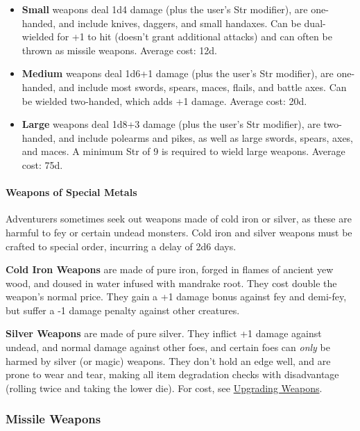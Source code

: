 \documentclass{book}
\providecommand{\tightlist}{%
\setlength{\itemsep}{0pt}\setlength{\parskip}{0pt}}
\begin{document}
\begin{itemize}
\tightlist
\item
  \textbf{Small} weapons deal 1d4 damage (plus the user's Str modifier),
  are one-handed, and include knives, daggers, and small handaxes. Can
  be dual-wielded for +1 to hit (doesn't grant additional attacks) and
  can often be thrown as missile weapons. Average cost: 12d.
\item
  \textbf{Medium} weapons deal 1d6+1 damage (plus the user's Str
  modifier), are one-handed, and include most swords, spears, maces,
  flails, and battle axes. Can be wielded two-handed, which adds +1
  damage. Average cost: 20d.
\item
  \textbf{Large} weapons deal 1d8+3 damage (plus the user's Str
  modifier), are two-handed, and include polearms and pikes, as well as
  large swords, spears, axes, and maces. A minimum Str of 9 is required
  to wield large weapons. Average cost: 75d.
\end{itemize}

\paragraph{Weapons of Special Metals}\label{weapons-of-special-metals}

Adventurers sometimes seek out weapons made of cold iron or silver, as
these are harmful to fey or certain undead monsters. Cold iron and
silver weapons must be crafted to special order, incurring a delay of
2d6 days.

\textbf{Cold Iron Weapons} are made of pure iron, forged in flames of
ancient yew wood, and doused in water infused with mandrake root. They
cost double the weapon's normal price. They gain a +1 damage bonus
against fey and demi-fey, but suffer a -1 damage penalty against other
creatures.

\textbf{Silver Weapons} are made of pure silver. They inflict +1 damage
against undead, and normal damage against other foes, and certain foes
can \emph{only} be harmed by silver (or magic) weapons. They don't hold
an edge well, and are prone to wear and tear, making all item
degradation checks with disadvantage (rolling twice and taking the lower
die). For cost, see \hyperref[upgrading-weapons]{Upgrading Weapons}.

\subsubsection*{Missile Weapons}\label{missile-weapons}
\end{document}
